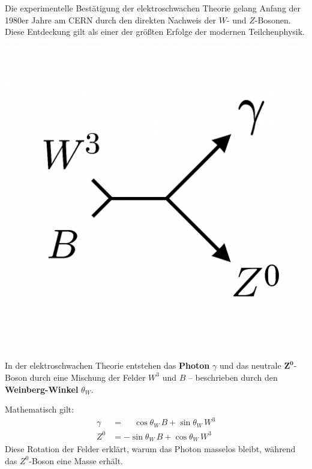 Die experimentelle Bestätigung der elektroschwachen Theorie gelang Anfang der 1980er Jahre am CERN durch den direkten Nachweis der \(W\)- und \(Z\)-Bosonen.  
Diese Entdeckung gilt als einer der größten Erfolge der modernen Teilchenphysik.
\medskip
\begin{tcolorbox}[didaktikbox, title=Vom \(W^3\) und \(B\) zum Photon]
	\label{box:weinberg_mischung}
	\small
	\begin{minipage}{0.35\linewidth}
		\centering
		\includegraphics[width=\linewidth]{bilder/weinberg_mischung.png}
	\end{minipage}%
	\begin{minipage}{0.63\linewidth}
		In der elektroschwachen Theorie entstehen das \textbf{Photon} \(\gamma\) und das neutrale 
		\(\mathbf{Z^0}\)-Boson durch eine Mischung der Felder \(W^3\) und \(B\) 
		– beschrieben durch den \textbf{Weinberg-Winkel} \(\theta_W\).  
		\vspace{0.3em}
		
		Mathematisch gilt:
		\[
		\begin{aligned}
			\gamma &= \phantom{-}\cos\theta_W \, B + \sin\theta_W \, W^3 \\
			Z^0    &= -\sin\theta_W \, B + \cos\theta_W \, W^3
		\end{aligned}
		\]
		Diese Rotation der Felder erklärt, warum das Photon masselos bleibt, während 
		das \(Z^0\)-Boson eine Masse erhält.
	\end{minipage}
\end{tcolorbox}


